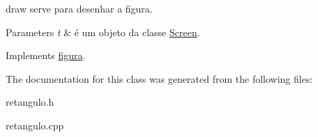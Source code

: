 draw serve para desenhar a figura. 


\begin{DoxyParams}{Parameters}
{\em t} & é um objeto da classe \hyperlink{classScreen}{Screen}. \\
\hline
\end{DoxyParams}


Implements \hyperlink{classfigura_a0afddf09965208311924d68e7a434f1d}{figura}.



The documentation for this class was generated from the following files\+:\begin{DoxyCompactItemize}
\item 
retangulo.\+h\item 
retangulo.\+cpp\end{DoxyCompactItemize}
